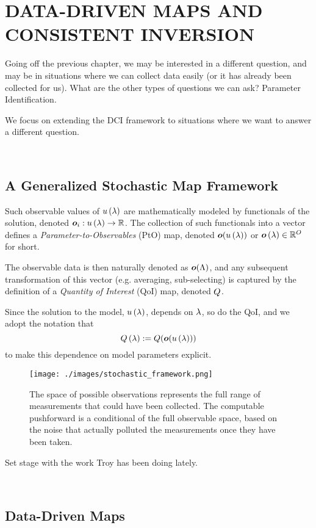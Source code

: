 \chapter{\uppercase{Data-Driven Maps and Consistent Inversion} \label{chapter:04}}

Going off the previous chapter, we may be interested in a different question, and may be in situations where we can collect data easily (or it has already been collected for us).
What are the other types of questions we can ask? Parameter Identification.

We focus on extending the DCI framework to situations where we want to answer a different question.

\
\section{A Generalized Stochastic Map Framework}
Such observable values of $u\left ( \lambda \right )$ are mathematically modeled by functionals of the solution, denoted $\operatorname*{\boldsymbol{o}}_i: u\left ( \lambda \right ) \to \mathbb{R}$.
The collection of such functionals into a vector defines a {\em Parameter-to-Observables} (PtO) map, denoted $\operatorname*{\boldsymbol{o}}( u\left ( \lambda \right ) )$ or $\operatorname*{\boldsymbol{o}}\left ( \lambda \right )\in\mathbb{R}^O$ for short.

The observable data is then naturally denoted as $\operatorname*{\boldsymbol{o}}({\Lambda})$, and any subsequent transformation of this vector (e.g. averaging, sub-selecting) is captured by the definition of a {\em Quantity of Interest} (QoI) map, denoted $Q$.

Since the solution to the model, $u\left ( \lambda \right )$, depends on $\lambda$, so do the QoI, and we adopt the notation that $$Q\left ( \lambda \right ) := Q(\operatorname*{\boldsymbol{o}}(u\left ( \lambda \right )))$$ to make this dependence on model parameters explicit.

\begin{figure}[ht]
\begin{minipage}{.975\textwidth}
\texttt{[image: ./images/stochastic\_framework.png]}
\end{minipage}
\caption{
The space of possible observations represents the full range of measurements that could have been collected.
The computable pushforward is a conditional of the full observable space, based on the noise that actually polluted the measurements once they have been taken.
}
\label{fig:stochastic_framework}
\end{figure}
\FloatBarrier

Set stage with the work Troy has been doing lately.

\
\section{Data-Driven Maps}


